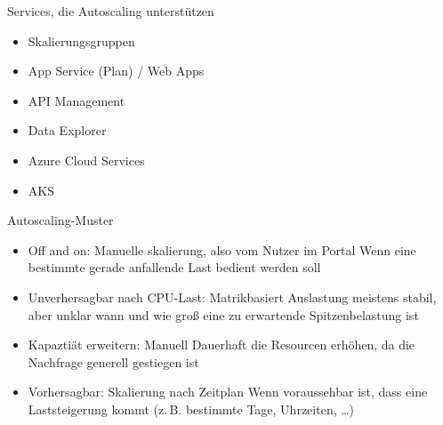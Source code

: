 
\begin{flashcard}[Definition]{Services, die Autoscaling unterstützen}
    \begin{itemize}
        \item Skalierungsgruppen
        \item App Service (Plan) / Web Apps
        \item API Management
        \item Data Explorer
        \item Azure Cloud Services
        \item AKS
    \end{itemize}
\end{flashcard}

\begin{flashcard}[Definition]{Autoscaling-Muster}
    \begin{itemize}
        \item Off and on: Manuelle skalierung, also vom Nutzer im Portal\newline
            Wenn eine bestimmte gerade anfallende Last bedient werden soll
        \item Unverhersagbar nach CPU-Last: Matrikbasiert\newline
            Auslastung meistens stabil, aber unklar wann und wie groß eine zu erwartende Spitzenbelastung ist
        \item Kapaztiät erweitern: Manuell\newline
            Dauerhaft die Resourcen erhöhen, da die Nachfrage generell gestiegen ist
        \item Vorhersagbar: Skalierung nach Zeitplan\newline
            Wenn voraussehbar ist, dass eine Laststeigerung kommt (z.\,B. bestimmte Tage, Uhrzeiten, \ldots)
    \end{itemize}
\end{flashcard}
